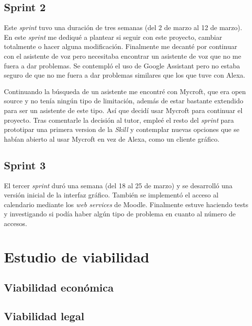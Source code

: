 \subsection{Sprint 2}

Este \textit{sprint} tuvo una duración de tres semanas (del 2 de marzo al 12 de marzo). En este \textit{sprint} me dediqué a plantear si seguir con este proyecto, cambiar totalmente o hacer alguna modificación. Finalmente me decanté por continuar con el asistente de voz pero necesitaba encontrar un asistente de voz que no me fuera a dar problemas. Se contempló el uso de Google Assistant pero no estaba seguro de que no me fuera a dar problemas similares que los que tuve con Alexa.

Continuando la búsqueda de un asistente me encontré con Mycroft, que era open source y no tenía ningún tipo de limitación, además de estar bastante extendido para ser un asistente de este tipo. Así que decidí usar Mycroft para continuar el proyecto.
Tras comentarle la decisión al tutor, empleé el resto del \textit{sprint} para prototipar una primera version de la \textit{Skill} y contemplar nuevas opciones que se habían abierto al usar Mycroft en vez de Alexa, como un cliente gráfico.

\subsection{Sprint 3}

El tercer \textit{sprint} duró una semana (del 18 al 25 de marzo) y se desarrolló una versión inicial de la interfaz gráfico. También se implementó el acceso al calendario mediante los \textit{web services} de Moodle. Finalmente estuve haciendo tests y investigando si podía haber algún tipo de problema en cuanto al número de accesos.

\section{Estudio de viabilidad}

\subsection{Viabilidad económica}

\subsection{Viabilidad legal}


